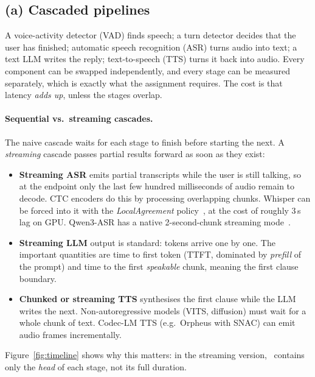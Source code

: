 \subsection{(a) Cascaded pipelines}
A voice-activity detector (VAD) finds speech; a turn detector decides that the user has finished;
automatic speech recognition (ASR) turns audio into text; a text LLM writes the reply; text-to-speech
(TTS) turns it back into audio. Every component can be swapped independently, and every stage can
be measured separately, which is exactly what the assignment requires. The cost is that latency
\emph{adds up}, unless the stages overlap.

\paragraph{Sequential vs.\ streaming cascades.}
The naive cascade waits for each stage to finish before starting the next. A \emph{streaming}
cascade passes partial results forward as soon as they exist:
\begin{itemize}
  \item \textbf{Streaming ASR} emits partial transcripts while the user is still talking, so at the
  endpoint only the last few hundred milliseconds of audio remain to decode. CTC encoders do this
  by processing overlapping chunks. Whisper can be forced into it with the \emph{LocalAgreement}
  policy~\cite{machacek2023}, at the cost of roughly 3\,s lag on GPU. Qwen3-ASR has a native
  2-second-chunk streaming mode~\cite{qwen3asr}.
  \item \textbf{Streaming LLM} output is standard: tokens arrive one by one. The important quantities
  are time to first token (TTFT, dominated by \emph{prefill} of the prompt) and time to the first
  \emph{speakable} chunk, meaning the first clause boundary.
  \item \textbf{Chunked or streaming TTS} synthesises the first clause while the LLM writes the next.
  Non-autoregressive models (VITS, diffusion) must wait for a whole chunk of text. Codec-LM TTS
  (e.g.\ Orpheus with SNAC) can emit audio frames incrementally.
\end{itemize}
Figure~\ref{fig:timeline} shows why this matters: in the streaming version, \ttfa\ contains only the
\emph{head} of each stage, not its full duration.

